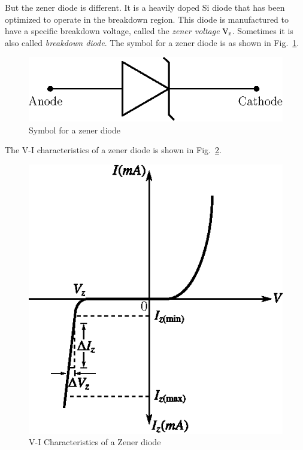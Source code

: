 But the zener diode is different. It is a heavily doped Si diode that has been optimized to operate in the breakdown region. This diode is manufactured to have a specific breakdown voltage, called the {\em zener voltage} $\textrm{V}_{\textrm{z}}$. Sometimes it is also called {\em breakdown diode}. The symbol for a zener diode is as shown in Fig.~\ref{fig1.44}.
\begin{figure}[H]
\centering
\includegraphics{chap1/fig1.44.eps}
\caption{Symbol for a zener diode}\label{fig1.44}
\end{figure}

 The V-I characteristics of a zener diode is shown in Fig.~\ref{fig1.45}.
\begin{figure}[H]
\centering
\includegraphics{chap1/fig1.45.eps}
\caption{V-I Characteristics of a Zener diode}\label{fig1.45}
\end{figure}

\eject


